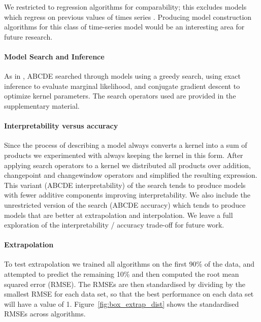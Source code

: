 \documentclass[letterpaper]{article}
\newcommand{\procedurename}{ABCDE}
\begin{document}
We restricted to regression algorithms for comparability; this excludes models which regress on previous values of times series \citep[e.g.][]{box2013time}.
Producing model construction algorithms for this class of time-series model would be an interesting area for future research.

\paragraph{Model Search and Inference}

As in \citep{DuvLloGroetal13}, \procedurename{} searched through models using a greedy search, using exact \gp{} inference to evaluate marginal likelihood, and conjugate gradient descent to optimize kernel parameters.
The search operators used are provided in the supplementary material.

\paragraph{Interpretability versus accuracy}

Since the process of describing a model always converts a kernel into a sum of products we experimented with always keeping the kernel in this form.
After applying search operators to a kernel we distributed all products over addition, changepoint and changewindow operators and simplified the resulting expression.
This variant (\procedurename{} interpretability) of the search tends to produce models with fewer additive components improving interpretability.
We also include the unrestricted version of the search (\procedurename{} accuracy) which tends to produce models that are better at extrapolation and interpolation.
%
We leave a full exploration of the interpretability / accuracy trade-off for future work.

\paragraph{Extrapolation}

To test extrapolation we trained all algorithms on the first 90\% of the data, and attempted to predict the remaining 10\% and then computed the root mean squared error (RMSE).
The RMSEs are then standardised by dividing by the smallest RMSE for each data set, so that the best performance on each data set will have a value of 1.
%
Figure~\ref{fig:box_extrap_dist} shows the standardised RMSEs across algorithms.
\end{document}
